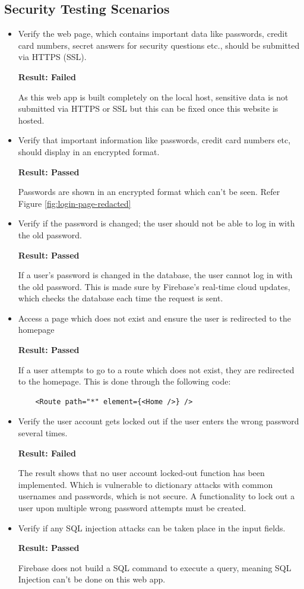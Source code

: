\subsection{Security Testing Scenarios}
\begin{itemize}
    \item Verify the web page, which contains important data like passwords, credit card numbers, secret answers for security questions etc., should be submitted via HTTPS (SSL).

    \textbf{Result: Failed}

    As this web app is built completely on the local host, sensitive data is not submitted via HTTPS or SSL but this can be fixed once this website is hosted.

    \item Verify that important information like passwords, credit card numbers etc,  should display in an encrypted format.

    \textbf{Result: Passed}

    Passwords are shown in an encrypted format which can't be seen. Refer Figure \ref{fig:login-page-redacted}

    \item Verify if the password is changed; the user should not be able to log in with the old password.

    \textbf{Result: Passed}
    
    If a user's password is changed in the database, the user cannot log in with the old password. This is made sure by Firebase's real-time cloud updates, which checks the database each time the request is sent.


    \item Access a page which does not exist and ensure the user is redirected to the homepage

    \textbf{Result: Passed }
    
    If a user attempts to go to a route which does not exist, they are redirected to the homepage. This is done through the following code:

    \begin{lstlisting}
    <Route path="*" element={<Home />} />
    \end{lstlisting}

    \item Verify the user account gets locked out if the user enters the wrong password several times.

    \textbf{Result: Failed}

    The result shows that no user account locked-out function has been implemented. Which is vulnerable to dictionary attacks with common usernames and passwords, which is not secure. A functionality to lock out a user upon multiple wrong password attempts must be created.

    \item Verify if any SQL injection attacks can be taken place in the input fields.

    \textbf{Result: Passed}

    Firebase does not build a SQL command to execute a query, meaning SQL Injection can't be done on this web app. 
\end{itemize}

